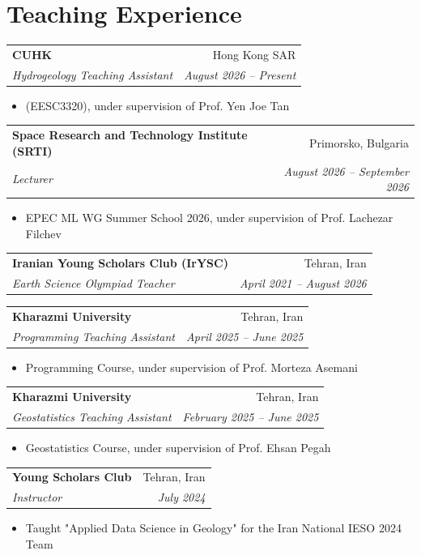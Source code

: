 \documentclass[letterpaper,10pt]{article}
\makeatletter
\newcommand{\resitem}[1]{\item #1 \vspace{-1pt}}
\newcommand{\ressubheading}[4]{%
	\begin{tabular*}{\textwidth}{l@{\cftdotfill{\cftsecdotsep}\extracolsep{\fill}}r}
		\textbf{#1} & #2 \\
		\textit{#3} & \textit{#4} \\
	\end{tabular*}\vspace{-2pt}
}
\makeatother
\begin{document}
	\section{Teaching Experience}
	\ressubheading{CUHK}{Hong Kong SAR}{Hydrogeology Teaching Assistant}{August 2026 – Present}
	\begin{itemize}[topsep=1pt,partopsep=0pt,itemsep=1pt,parsep=0pt]
		\resitem{(EESC3320), under supervision of Prof. Yen Joe Tan}
	\end{itemize}

	\vspace{-0.1em}
	
	\ressubheading{Space Research and Technology Institute (SRTI)}{Primorsko, Bulgaria}{Lecturer}{August 2026 – September 2026}
	\begin{itemize}[topsep=1pt,partopsep=0pt,itemsep=1pt,parsep=0pt]
		\resitem{EPEC ML WG Summer School 2026, under supervision of Prof. Lachezar Filchev}
	\end{itemize}

	\vspace{-0.1em}
	
	\ressubheading{Iranian Young Scholars Club (IrYSC)}{Tehran, Iran}{Earth Science Olympiad Teacher}{April 2021 – August 2026}
	
	\vspace{-0.2em}
	
	\ressubheading{Kharazmi University}{Tehran, Iran}{Programming Teaching Assistant}{April 2025 – June 2025}
	\begin{itemize}[topsep=1pt,partopsep=0pt,itemsep=1pt,parsep=0pt]
		\resitem{Programming Course, under supervision of Prof. Morteza Asemani}
	\end{itemize}

	\vspace{-0.2em}
	
	\ressubheading{Kharazmi University}{Tehran, Iran}{Geostatistics Teaching Assistant}{February 2025 – June 2025}
	\begin{itemize}[topsep=1pt,partopsep=0pt,itemsep=1pt,parsep=0pt]
		\resitem{Geostatistics Course, under supervision of Prof. Ehsan Pegah}
	\end{itemize}

	\vspace{-0.1em}
	
	\ressubheading{Young Scholars Club}{Tehran, Iran}{Instructor}{July 2024}
	\begin{itemize}[topsep=1pt,partopsep=0pt,itemsep=1pt,parsep=0pt]
		\resitem{Taught "Applied Data Science in Geology" for the Iran National IESO 2024 Team}

	\end{itemize}
\end{document}
